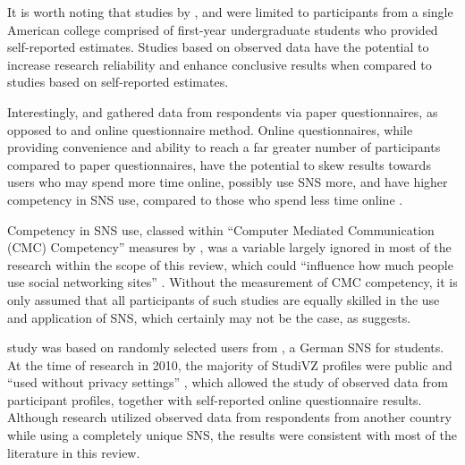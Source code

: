 It is worth noting that studies by \citet{Raacke2008}, \citet{Muscanell2012} and \citet{Joiner2014} were limited to participants from a single American college comprised of first-year undergraduate students who provided self-reported estimates. Studies based on observed data have the potential to increase research reliability and enhance conclusive results when compared to studies based on self-reported estimates.

\newpage
Interestingly, \citet{Raacke2008} and \citet{Joiner2014} gathered data from respondents via paper questionnaires, as opposed to  and  online questionnaire method. Online questionnaires, while providing convenience and ability to reach a far greater number of participants compared to paper questionnaires, have the potential to skew results towards users who may spend more time online, possibly use SNS more, and have higher competency in SNS use, compared to those who spend less time online \citep[p. 280]{Hargittai2007}.

Competency in SNS use, classed within ``Computer Mediated Communication (CMC) Competency'' measures by \citet[p. 579]{Ross2009}, was a variable largely ignored in most of the research within the scope of this review, which could ``influence how much people use social networking sites'' \citep[p. 898]{Kimbrough2013}. Without the measurement of CMC competency, it is only assumed that all participants of such studies are equally skilled in the use and application of SNS, which certainly may not be the case, as \citet{Ross2009} suggests.


 study was based on randomly selected users from \citet{StudiVZ2014}, a German SNS for students. At the time of research in 2010, the majority of StudiVZ profiles were public and ``used without privacy settings'' \citep[p. 92]{Haferkamp2012}, which allowed the study of observed data from participant profiles, together with self-reported online questionnaire results. Although  research utilized observed data from respondents from another country while using a completely unique SNS, the results were consistent with most of the literature in this review.